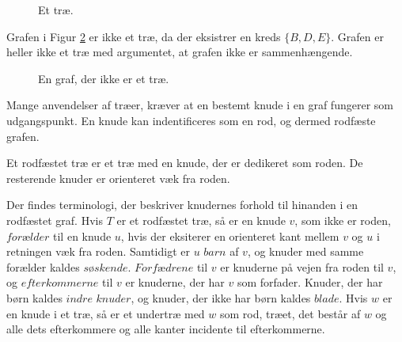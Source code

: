 \begin{figure}[h]
\centering
{}
\caption{Et træ.} 
\label{eksempel_tree}
\end{figure}

\noindent Grafen i Figur \ref{eksempel_notree} er ikke et træ, da der eksistrer en kreds $\lbrace B, D, E \rbrace$. Grafen er heller ikke et træ med argumentet, at grafen ikke er sammenhængende.\\

\begin{figure}[h]
\centering
{}
\caption{En graf, der ikke er et træ.} 
\label{eksempel_notree}
\end{figure}

\noindent Mange anvendelser af træer, kræver at en bestemt knude i en graf fungerer som udgangspunkt. En knude kan indentificeres som en rod, og dermed rodfæste grafen.

\begin{defn}
Et rodfæstet træ er et træ med en knude, der er dedikeret som roden. De resterende knuder er orienteret væk fra roden.
\end{defn}

\noindent Der findes terminologi, der beskriver knudernes forhold til hinanden i en rodfæstet graf. 
Hvis $T$ er et rodfæstet træ, så er en knude $v$, som ikke er roden, $\textit{forælder}$ til en knude $u$, hvis der eksiterer en orienteret kant mellem $v$ og $u$ i retningen væk fra roden.
Samtidigt er $u$ $\textit{barn}$ af $v$, og knuder med samme forælder kaldes $\textit{søskende}$. 
$\textit{Forfædrene}$ til $v$ er knuderne på vejen fra roden til $v$, og $\textit{efterkommerne}$ til $v$ er knuderne, der har $v$ som forfader. 
Knuder, der har børn kaldes $\textit{indre knuder}$, og knuder, der ikke har børn kaldes $\textit{blade}$.
Hvis $w$ er en knude i et træ, så er et undertræ med $w$ som rod, træet, det består af $w$ og alle dets efterkommere og alle kanter incidente til efterkommerne.

